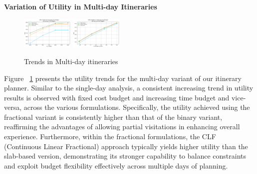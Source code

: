 \newpage
\noindent\textbf{Variation of Utility in Multi-day Itineraries}

\begin{figure}[H]
\includegraphics[width=0.22\textwidth]{plots/multiday1.png}
\includegraphics[width=0.22\textwidth]{plots/multiday2.png}
\caption{Trends in Multi-day itineraries}
\label{fig:util_md}
\end{figure}

Figure ~\ref{fig:util_md} presents the utility trends for the multi-day variant of our itinerary planner. Similar to the single-day analysis, a consistent increasing trend in utility results is observed with fixed cost budget and increasing time budget and vice-versa, across the various formulations. Specifically, the utility achieved using the fractional variant is consistently higher than that of the binary variant, reaffirming the advantages of allowing partial visitations in enhancing overall experience. Furthermore, within the fractional formulations, the CLF (Continuous Linear Fractional) approach typically yields higher utility than the slab-based version, demonstrating its stronger capability to balance constraints and exploit budget flexibility effectively across multiple days of planning.\\

